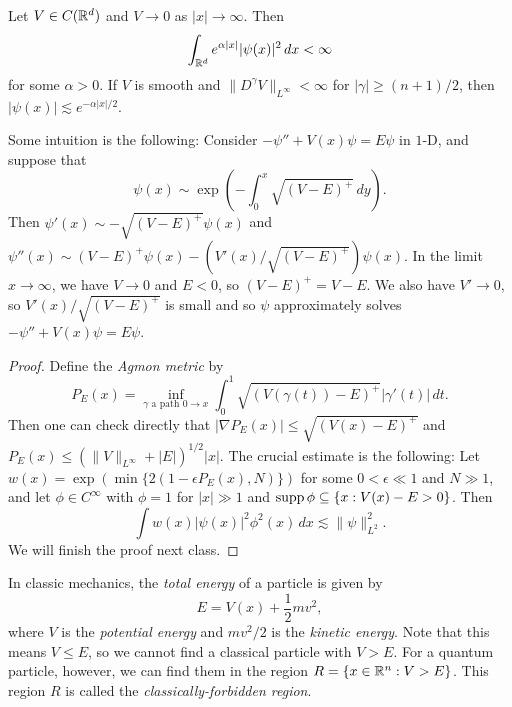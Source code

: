 \begin{theorem}
  Let $V \in C(\mathbb{R}^d)$ and $V \to 0$ as $|x| \to \infty$.
  Then
  \[
    \int_{\mathbb{R}^d} e^{\alpha |x|} |\psi(x)|^2\, dx < \infty
  \]
  for some $\alpha > 0$. If $V$ is smooth and
  $\|D^\gamma V\|_{L^\infty} < \infty$ for
  $|\gamma| \ge (n + 1) / 2$, then
  $|\psi(x)| \lesssim e^{-\alpha |x| / 2}$.
\end{theorem}

\begin{remark}
  Some intuition is the following:
  Consider $-\psi'' + V(x) \psi = E\psi$ in $1$-D,
  and suppose that
  \[
    \psi(x) \sim \exp\left(-\int_0^x\sqrt{(V - E)^+}\, dy\right).
  \]
  Then $\psi'(x) \sim -\sqrt{(V - E)^+} \psi(x)$ and
  $\psi''(x) \sim (V - E)^+ \psi(x) - (V'(x) / \sqrt{(V - E)^+}) \psi(x)$.
  In the limit $x \to \infty$, we have
  $V \to 0$ and $E < 0$, so
  $(V - E)^+ = V - E$. We also have $V' \to 0$, so
  $V'(x) / \sqrt{(V - E)^+}$ is small and so
  $\psi$ approximately solves
  $-\psi'' + V(x) \psi = E\psi$.
\end{remark}

\begin{proof}
  Define the \emph{Agmon metric} by
  \[
    P_E(x) = \inf_{\text{$\gamma$ a path $0 \to x$}}
    \int_0^1 \sqrt{(V(\gamma(t)) - E)^+} |\gamma'(t)|\, dt.
  \]
  Then one can check directly that $|\nabla P_E(x)| \le \sqrt{(V(x) - E)^+}$
  and $P_E(x) \le (\|V\|_{L^\infty} + |E|)^{1 / 2} |x|$.
  The crucial estimate is the following: Let
  $w(x) = \exp(\min\{2(1 - \epsilon P_E(x), N)\})$
  for some $0 < \epsilon \ll 1$ and $N \gg 1$, and let
  $\phi \in C^\infty$ with $\phi = 1$ for
  $|x| \gg 1$ and $\operatorname{supp} \phi \subseteq \{x : V(x) - E > 0 \}$.
  Then
  \[
    \int w(x) |\psi(x)|^2 \phi^2(x)\, dx \lesssim \|\psi\|_{L^2}^2.
  \]
  We will finish the proof next class.
\end{proof}

\begin{remark}
  In classic mechanics, the \emph{total energy} of
  a particle is given by
  \[
    E = V(x) + \frac{1}{2} mv^2,
  \]
  where $V$ is the \emph{potential energy} and $mv^2 / 2$
  is the \emph{kinetic energy}. Note that this means
  $V \le E$, so we cannot find a classical particle
  with $V > E$. For a quantum particle, however,
  we can find them in the region
  $R = \{x \in \mathbb{R}^n : V > E\}$. This region $R$ is
  called the \emph{classically-forbidden region}.
\end{remark}
